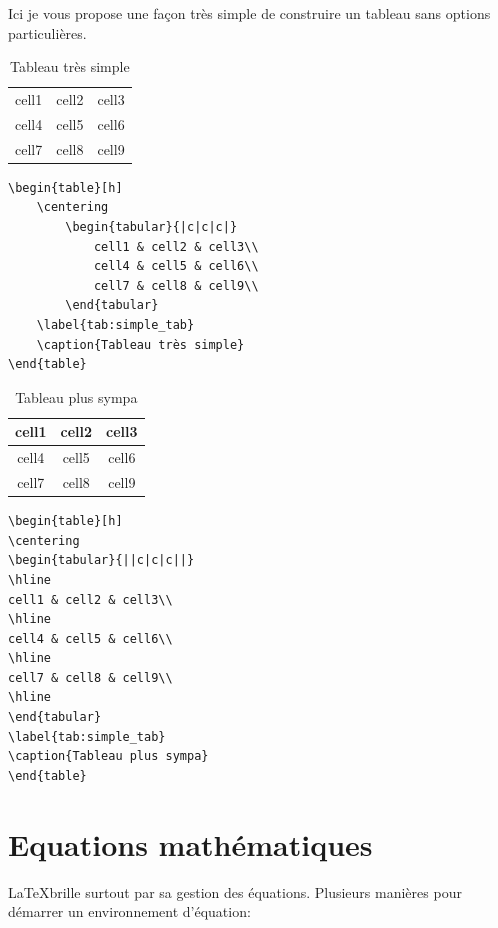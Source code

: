 \documentclass[11pt,a4paper]{article}
\begin{document}
Ici je vous propose une façon très simple de construire un tableau sans options particulières.

\begin{table}[h]
	\centering
	\begin{tabular}{|c|c|c|}
		cell1 & cell2 & cell3\\
		cell4 & cell5 & cell6\\
		cell7 & cell8 & cell9\\
	\end{tabular}
	\label{tab:simple_tab}
	\caption{Tableau très simple}
\end{table}

\begin{verbatim}
\begin{table}[h]
	\centering
		\begin{tabular}{|c|c|c|}
			cell1 & cell2 & cell3\\
			cell4 & cell5 & cell6\\
			cell7 & cell8 & cell9\\
		\end{tabular}
	\label{tab:simple_tab}
	\caption{Tableau très simple}
\end{table}
\end{verbatim}

\begin{table}[h]
	\centering
	\begin{tabular}{||c|c|c||}
		\hline
		cell1 & cell2 & cell3\\
		\hline
		cell4 & cell5 & cell6\\
		\hline
		cell7 & cell8 & cell9\\
		\hline
	\end{tabular}
	\label{tab:simple_tab}
	\caption{Tableau plus sympa}
\end{table}

\begin{verbatim}
\begin{table}[h]
\centering
\begin{tabular}{||c|c|c||}
\hline
cell1 & cell2 & cell3\\
\hline
cell4 & cell5 & cell6\\
\hline
cell7 & cell8 & cell9\\
\hline
\end{tabular}
\label{tab:simple_tab}
\caption{Tableau plus sympa}
\end{table}
\end{verbatim}

\section{Equations mathématiques}
\LaTeX brille surtout par sa gestion des équations. Plusieurs manières pour démarrer un environnement d'équation:
\end{document}
